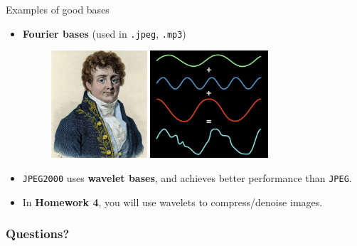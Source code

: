 \documentclass{beamer}
\begin{document}
\begin{frame}[t]{Examples of good bases}
	\begin{itemize}
		\item \textbf{Fourier bases} (used in \texttt{.jpeg}, \texttt{.mp3})
			\begin{figure}
				\includegraphics[height=4cm]{./fourier.jpeg}
				\hspace{1cm}
				\includegraphics[height=4cm]{./fourier_dec.jpg}
			\end{figure}

		\item \texttt{JPEG2000} uses \textbf{wavelet bases}, and achieves better performance than \texttt{JPEG}.
		\item In \textbf{Homework 4}, you will use wavelets to compress/denoise images.
	\end{itemize}
\end{frame}
\appendix
\backupbegin
\begin{frame}
	\frametitle{Questions?}
\end{frame}
\backupend
\end{document}

